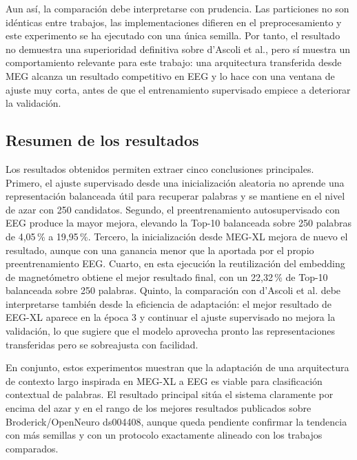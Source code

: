 Aun así, la comparación debe interpretarse con prudencia. Las particiones no son idénticas entre trabajos, las implementaciones difieren en el preprocesamiento y este experimento se ha ejecutado con una única semilla. Por tanto, el resultado no demuestra una superioridad definitiva sobre d'Ascoli et al., pero sí muestra un comportamiento relevante para este trabajo: una arquitectura transferida desde MEG alcanza un resultado competitivo en EEG y lo hace con una ventana de ajuste muy corta, antes de que el entrenamiento supervisado empiece a deteriorar la validación.

\subsection{Resumen de los resultados}

Los resultados obtenidos permiten extraer cinco conclusiones principales. Primero, el ajuste supervisado desde una inicialización aleatoria no aprende una representación balanceada útil para recuperar palabras y se mantiene en el nivel de azar con 250 candidatos. Segundo, el preentrenamiento autosupervisado con EEG produce la mayor mejora, elevando la Top-10 balanceada sobre 250 palabras de 4,05\,\% a 19,95\,\%. Tercero, la inicialización desde MEG-XL mejora de nuevo el resultado, aunque con una ganancia menor que la aportada por el propio preentrenamiento EEG. Cuarto, en esta ejecución la reutilización del embedding de magnetómetro obtiene el mejor resultado final, con un 22,32\,\% de Top-10 balanceada sobre 250 palabras. Quinto, la comparación con d'Ascoli et al. debe interpretarse también desde la eficiencia de adaptación: el mejor resultado de EEG-XL aparece en la época 3 y continuar el ajuste supervisado no mejora la validación, lo que sugiere que el modelo aprovecha pronto las representaciones transferidas pero se sobreajusta con facilidad.

En conjunto, estos experimentos muestran que la adaptación de una arquitectura de contexto largo inspirada en MEG-XL a EEG es viable para clasificación contextual de palabras. El resultado principal sitúa el sistema claramente por encima del azar y en el rango de los mejores resultados publicados sobre Broderick/OpenNeuro ds004408, aunque queda pendiente confirmar la tendencia con más semillas y con un protocolo exactamente alineado con los trabajos comparados.

